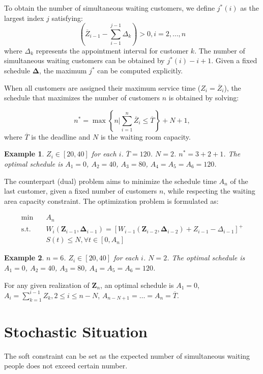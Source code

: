 \documentclass{article}
\newcommand{\Z}{\mathbf{Z}}
\newcommand{\D}{\bm{\Delta}}
\newtheorem{example}{Example}
\begin{document}
To obtain the number of simultaneous waiting customers, we define $j^{*}(i)$ as the largest index $j$ satisfying: 
$$(\overline{Z}_{i-1}- \sum_{i-1}^{j-1} \Delta_{k})> 0, i =2, \ldots, n$$ 
where $\Delta_{k}$ represents the appointment interval for customer $k$. The number of simultaneous waiting customers can be obtained by $j^{*}(i) -i +1$. Given a fixed schedule $\D$, the maximum $j^{*}$ can be computed explicitly.


When all customers are assigned their maximum service time ($Z_{i} = \overline{Z}_{i}$), the schedule that maximizes the number of customers $n$ is obtained by solving:

$$n^{*} = \max\left\{n\bigg|\sum_{i=1}^{n} \overline{Z}_{i} \leq \overline{T}\right\} + N +1,$$ where $\overline{T}$ is the deadline and $N$ is the waiting room capacity.

\begin{example}
    $Z_{i} \in [20, 40]$ for each $i$. $\overline{T} =120$. $N =2$. $n^{*} = 3 + 2 +1$. The optimal schedule is $A_{1} = 0$, $A_2 = 40$, $A_3 = 80$, $A_4 =A_5 = A_6 = 120$.
\end{example}

The counterpart (dual) problem aims to minimize the schedule time $A_n$ of the last customer, given a fixed number of customers $n$, while respecting the waiting area capacity constraint. The optimization problem is formulated as:

\begin{equation}
    \begin{aligned}
        \min \quad & A_{n} \\
        \mbox{s.t.} \quad & W_{i}(\Z_{i-1}, \D_{i-1}) = [W_{i-1}(\Z_{i-2}, \D_{i-2}) + Z_{i-1} - \Delta_{i-1}]^{+} \\
        & S(t) \leq N, \forall t \in [0, A_n]
    \end{aligned}
\end{equation}


\begin{example}
    $n = 6$. $Z_{i} \in [20, 40]$ for each $i$. $N =2$. The optimal schedule is $A_{1} = 0$, $A_2 = 40$, $A_3 = 80$, $A_4 =A_5 = A_6 = 120$.
\end{example}

For any given realization of $\Z_n$, an optimal schedule is $A_1 = 0$, $A_i = \sum_{k=1}^{i-1} Z_k, 2 \leq i \leq n-N$, $A_{n-N+1} = \ldots = A_{n} = \overline{T}$.


\section{Stochastic Situation}
The soft constraint can be set as the expected number of simultaneous waiting people does not exceed certain number. 
\end{document}
